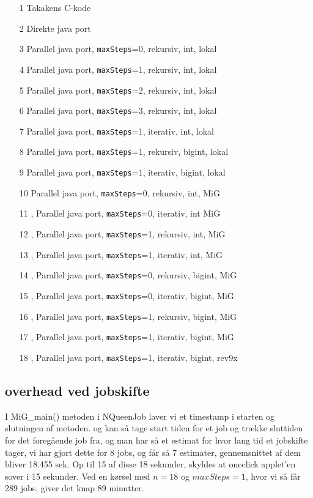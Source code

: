\begin{itemize}
\item[1] Takakens C-kode
\item[2] Direkte java port
\item[3] Parallel java port, \texttt{maxSteps}=0, rekursiv, int, lokal
\item[4] Parallel java port, \texttt{maxSteps}=1, rekursiv, int, lokal
\item[5] Parallel java port, \texttt{maxSteps}=2, rekursiv, int, lokal
\item[6] Parallel java port, \texttt{maxSteps}=3, rekursiv, int, lokal
\item[7] Parallel java port, \texttt{maxSteps}=1, iterativ, int, lokal
\item[8] Parallel java port, \texttt{maxSteps}=1, rekursiv, bigint, lokal
\item[9] Parallel java port, \texttt{maxSteps}=1, iterativ, bigint, lokal
\item[10] Parallel java port, \texttt{maxSteps}=0, rekursiv, int, MiG
\item[11], Parallel java port, \texttt{maxSteps}=0, iterativ, int MiG
\item[12], Parallel java port, \texttt{maxSteps}=1, rekursiv, int, MiG
\item[13], Parallel java port, \texttt{maxSteps}=1, iterativ, int, MiG
\item[14], Parallel java port, \texttt{maxSteps}=0, rekursiv, bigint, MiG
\item[15], Parallel java port, \texttt{maxSteps}=0, iterativ, bigint, MiG
\item[16], Parallel java port, \texttt{maxSteps}=1, rekursiv, bigint, MiG
\item[17], Parallel java port, \texttt{maxSteps}=1, iterativ, bigint, MiG
\item[18], Parallel java port, \texttt{maxSteps}=1, iterativ, bigint, rev9x 
\end{itemize}

\subsection{overhead ved jobskifte}

I MiG\_main() metoden i NQueenJob laver vi et timestamp i starten og slutningen af metoden. 
og kan så tage start tiden for et job og trække sluttiden for det foregående job
fra, og man har så et estimat for hvor lang tid et jobskifte tager, vi har gjort
dette for 8 jobs, og får så 7 estimater, gennemsnittet af dem bliver 18.455 sek. 
Op til 15 af disse 18 sekunder, skyldes at oneclick applet'en sover i 15 sekunder. 
Ved en kørsel med $n=18$ og $maxSteps=1$, hvor vi så får 289 jobs, giver det
knap 89 minutter. 

